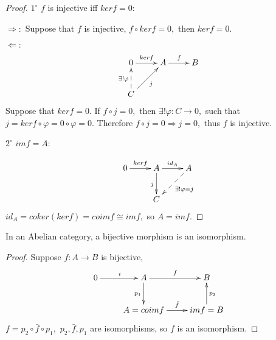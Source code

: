 \begin{proof}
$\mathit{1^{\circ}}$ $f$ is injective iff $kerf=0:$

$\Longrightarrow:$ Suppose that $f$ is injective, $f\circ kerf=0,$
then $kerf=0.$

$\Longleftarrow:$
\[ \xymatrix{
   0 \ar[r]^-{kerf} & A \ar[r]^f & B             \\
   C \ar@{-->}[u]^{\exists!\varphi} \ar[ur]_j }  \]
Suppose that $kerf=0.$ If $f\circ j=0,$ then $\exists!\varphi: C
\rightarrow 0,$ such that $j=kerf\circ\varphi=0\circ\varphi=0.$
Therefore $f\circ j=0\Longrightarrow j=0,$ thus $f$ is injective.

$\mathit{2^{\circ}}$ $imf=A:$

\[ \xymatrix{
   0 \ar[r]^-{kerf} & A \ar[r]^-{id_A} \ar[d]_j & A
   \ar@{-->}[dl]^{\exists!\varphi=j}              \\
   & C }  \]
$id_A=coker(kerf)=coimf\cong imf,$ so $A=imf.$
\end{proof}
\begin{cor}
In an Abelian category, a bijective morphism is an isomorphism.
\end{cor}
\begin{proof}
Suppose $f: A\rightarrow B$ is bijective,
\[ \xymatrix{
   0 \ar[r]^i & A \ar[r]^f \ar[d]_{p_1} & B                \\
   & {A=coimf} \ar[r]^-{\bar{f}} & {imf=B} \ar[u]_{p_2} }  \]
$f=p_2\circ\bar{f}\circ p_1,$ $p_2,\bar{f},p_1$ are isomorphisms, so
$f$ is an isomorphism.
\end{proof}
